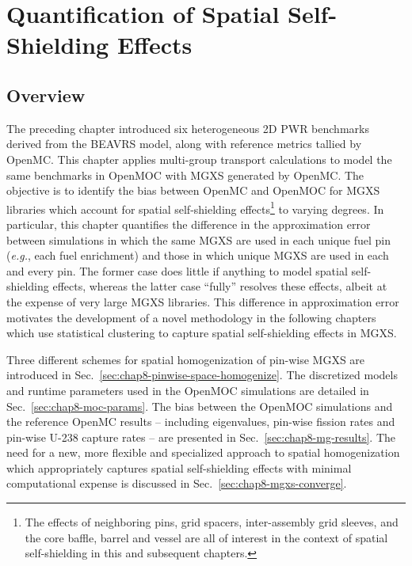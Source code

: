 \chapter{Quantification of Spatial Self-Shielding Effects}
\label{chap:quantify}


\section{Overview}
\label{sec:chap8-overview}

The preceding chapter introduced six heterogeneous 2D \ac{PWR} benchmarks derived from the \ac{BEAVRS} model, along with reference metrics tallied by OpenMC. This chapter applies multi-group transport calculations to model the same benchmarks in OpenMOC with \ac{MGXS} generated by OpenMC. The objective is to identify the bias between OpenMC and OpenMOC for \ac{MGXS} libraries which account for spatial self-shielding effects\footnote{The effects of neighboring pins, grid spacers, inter-assembly grid sleeves, and the core baffle, barrel and vessel are all of interest in the context of spatial self-shielding in this and subsequent chapters.} to varying degrees. In particular, this chapter quantifies the difference in the approximation error between simulations in which the same \ac{MGXS} are used in each unique fuel pin (\textit{e.g.}, each fuel enrichment) and those in which unique \ac{MGXS} are used in each and every pin. The former case does little if anything to model spatial self-shielding effects, whereas the latter case ``fully'' resolves these effects, albeit at the expense of very large \ac{MGXS} libraries. This difference in approximation error motivates the development of a novel methodology in the following chapters which use statistical clustering to capture spatial self-shielding effects in \ac{MGXS}.

Three different schemes for spatial homogenization of pin-wise \ac{MGXS} are introduced in Sec.~\ref{sec:chap8-pinwise-space-homogenize}. The discretized models and runtime parameters used in the OpenMOC simulations are detailed in Sec.~\ref{sec:chap8-moc-params}. The bias between the OpenMOC simulations and the reference OpenMC results -- including eigenvalues, pin-wise fission rates and pin-wise U-238 capture rates -- are presented in Sec.~\ref{sec:chap8-mg-results}. The need for a new, more flexible and specialized approach to spatial homogenization which appropriately captures spatial self-shielding effects with minimal computational expense is discussed in Sec.~\ref{sec:chap8-mgxs-converge}.


